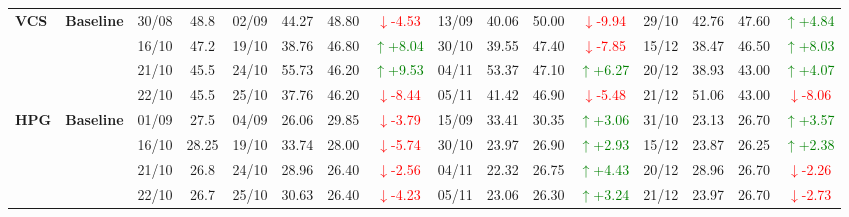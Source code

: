 \documentclass{ieeeaccess}
\begin{document}
{\begin{longtable}{llcc|cccc|cccc|cccc}
\multirow{4}{*}{\textbf{VCS}}
& \textbf{Baseline}
& 30/08 & 48.8 & 02/09 & 44.27 & 48.80 & \textcolor{red}{\(\downarrow\)-4.53} & 13/09 & 40.06 & 50.00 & \textcolor{red}{\(\downarrow\)-9.94} & 29/10 & 42.76 & 47.60 & \textcolor{green}{\(\uparrow\)+4.84} \\
& & 16/10 & 47.2 & 19/10 & 38.76 & 46.80 & \textcolor{green}{\(\uparrow\)+8.04} & 30/10 & 39.55 & 47.40 & \textcolor{red}{\(\downarrow\)-7.85} & 15/12 & 38.47 & 46.50 & \textcolor{green}{\(\uparrow\)+8.03} \\
& & 21/10 & 45.5 & 24/10 & 55.73 & 46.20 & \textcolor{green}{\(\uparrow\)+9.53} & 04/11 & 53.37 & 47.10 & \textcolor{green}{\(\uparrow\)+6.27} & 20/12 & 38.93 & 43.00 & \textcolor{green}{\(\uparrow\)+4.07} \\
& & 22/10 & 45.5 & 25/10 & 37.76 & 46.20 & \textcolor{red}{\(\downarrow\)-8.44} & 05/11 & 41.42 & 46.90 & \textcolor{red}{\(\downarrow\)-5.48} & 21/12 & 51.06 & 43.00 & \textcolor{red}{\(\downarrow\)-8.06} \\
\midrule

\multirow{4}{*}{\textbf{HPG}}
& \textbf{Baseline}
& 01/09 & 27.5 & 04/09 & 26.06 & 29.85 & \textcolor{red}{\(\downarrow\)-3.79} & 15/09 & 33.41 & 30.35 & \textcolor{green}{\(\uparrow\)+3.06} & 31/10 & 23.13 & 26.70 & \textcolor{green}{\(\uparrow\)+3.57} \\
& & 16/10 & 28.25 & 19/10 & 33.74 & 28.00 & \textcolor{red}{\(\downarrow\)-5.74} & 30/10 & 23.97 & 26.90 & \textcolor{green}{\(\uparrow\)+2.93} & 15/12 & 23.87 & 26.25 & \textcolor{green}{\(\uparrow\)+2.38} \\
& & 21/10 & 26.8 & 24/10 & 28.96 & 26.40 & \textcolor{red}{\(\downarrow\)-2.56} & 04/11 & 22.32 & 26.75 & \textcolor{green}{\(\uparrow\)+4.43} & 20/12 & 28.96 & 26.70 & \textcolor{red}{\(\downarrow\)-2.26} \\
& & 22/10 & 26.7 & 25/10 & 30.63 & 26.40 & \textcolor{red}{\(\downarrow\)-4.23} & 05/11 & 23.06 & 26.30 & \textcolor{green}{\(\uparrow\)+3.24} & 21/12 & 23.97 & 26.70 & \textcolor{red}{\(\downarrow\)-2.73} \\
\midrule


\end{longtable}}
\end{document}
